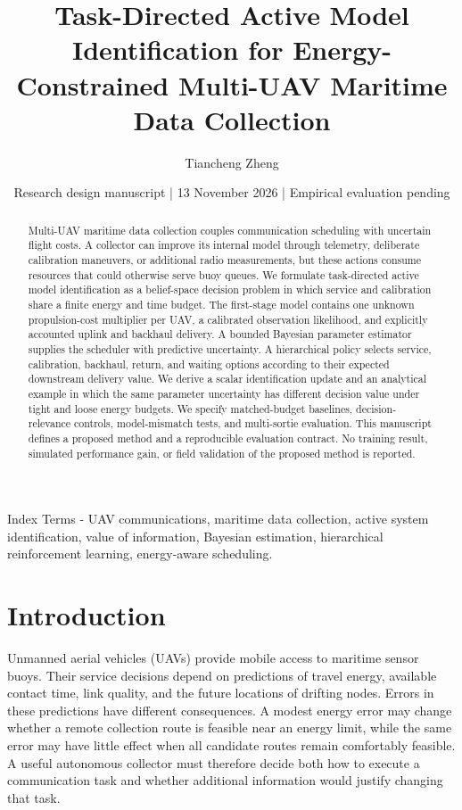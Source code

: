 \documentclass[10pt,twocolumn,letterpaper]{article}
\title{Task-Directed Active Model Identification for Energy-Constrained Multi-UAV Maritime Data Collection}
\author{Tiancheng Zheng}
\date{\small Research design manuscript | 13 November 2026 | Empirical evaluation pending}
\begin{document}
\maketitle
\nocite{wagenmaker2021task,memmel2024asid,aoyama2025poke,tang2026auto,esrafilian2019learning,shrestha2023spectrum,song2026partialckm,dai2024wind,li2026predictive,schulman2017ppo,yu2022mappo}
\begin{abstract}
Multi-UAV maritime data collection couples communication scheduling with uncertain flight costs. A collector can improve its internal model through telemetry, deliberate calibration maneuvers, or additional radio measurements, but these actions consume resources that could otherwise serve buoy queues. We formulate task-directed active model identification as a belief-space decision problem in which service and calibration share a finite energy and time budget. The first-stage model contains one unknown propulsion-cost multiplier per UAV, a calibrated observation likelihood, and explicitly accounted uplink and backhaul delivery. A bounded Bayesian parameter estimator supplies the scheduler with predictive uncertainty. A hierarchical policy selects service, calibration, backhaul, return, and waiting options according to their expected downstream delivery value. We derive a scalar identification update and an analytical example in which the same parameter uncertainty has different decision value under tight and loose energy budgets. We specify matched-budget baselines, decision-relevance controls, model-mismatch tests, and multi-sortie evaluation. This manuscript defines a proposed method and a reproducible evaluation contract. No training result, simulated performance gain, or field validation of the proposed method is reported.
\end{abstract}
Index Terms - UAV communications, maritime data collection, active system identification, value of information, Bayesian estimation, hierarchical reinforcement learning, energy-aware scheduling.

\section{Introduction}
Unmanned aerial vehicles (UAVs) provide mobile access to maritime sensor buoys. Their service decisions depend on predictions of travel energy, available contact time, link quality, and the future locations of drifting nodes. Errors in these predictions have different consequences. A modest energy error may change whether a remote collection route is feasible near an energy limit, while the same error may have little effect when all candidate routes remain comfortably feasible. A useful autonomous collector must therefore decide both how to execute a communication task and whether additional information would justify changing that task.
\end{document}
